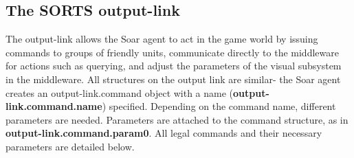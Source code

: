 \subsection{The SORTS output-link}

The output-link allows the Soar agent to act in the game world by issuing commands to groups of friendly units, communicate directly to the middleware for actions such as querying,
and adjust the parameters of the visual subsystem in the middleware. All structures on the output link are similar- the Soar agent creates an output-link.command object with a name (\textbf{output-link.command.name}) specified. Depending on the command name, different parameters are needed. Parameters are attached to the command structure, as in \textbf{output-link.command.param0}. All legal commands and their necessary parameters are detailed below.


